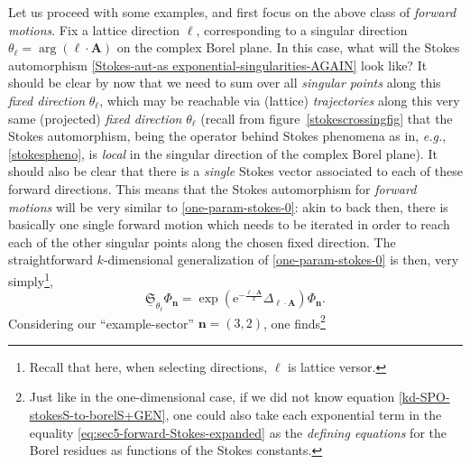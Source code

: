 \documentclass[11pt,a4paper]{article}
\newcommand{\rme}{{\mathrm{e}}}
\begin{document}
Let us proceed with some examples, and first focus on the above class of \textit{forward motions}. Fix a lattice direction $\boldsymbol{\ell}$, corresponding to a singular direction $\theta_{\boldsymbol{\ell}} = \arg \left( \boldsymbol{\ell} \cdot \boldsymbol{A} \right)$ on the complex Borel plane. In this case, what will the Stokes automorphism \eqref{Stokes-aut-as exponential-singularities-AGAIN} look like? It should be clear by now that we need to sum over all \textit{singular points} along this \textit{fixed direction} $\theta_{\boldsymbol{\ell}}$, which may be reachable via (lattice) \textit{trajectories} along this very same (projected) \textit{fixed direction} $\theta_{\boldsymbol{\ell}}$ (recall from figure~\ref{stokescrossingfig} that the Stokes automorphism, being the operator behind Stokes phenomena as in, \textit{e.g.}, \eqref{stokespheno}, is \textit{local} in the singular direction of the complex Borel plane). It should also be clear that there is a \textit{single} Stokes vector associated to each of these forward directions. This means that the Stokes automorphism for \textit{forward motions} will be very similar to \eqref{one-param-stokes-0}: akin to back then, there is basically one single forward motion which needs to be iterated in order to reach each of the other singular points along the chosen fixed direction. The straightforward $k$-dimensional generalization of \eqref{one-param-stokes-0} is then, very simply\footnote{Recall that here, when selecting directions, $\boldsymbol{\ell}$ is lattice versor.},
%
\begin{equation}
\label{eq:sec5-Stokes-forward-direction-theta}
\underline{\mathfrak{S}}_{\theta_{\boldsymbol{\ell}}} \Phi_{\boldsymbol{n}} = \exp \left( \rme^{-\frac{\boldsymbol{\ell}\cdot\boldsymbol{A}}{x}} \Delta_{\boldsymbol{\ell}\cdot\boldsymbol{A}} \right) \Phi_{\boldsymbol{n}}.
\end{equation}
%
\noindent
Considering our ``example-sector'' $\boldsymbol{n} = (3,2)$, one finds\footnote{Just like in the one-dimensional case, if we did not know equation \eqref{kd-SPO-stokesS-to-borelS+GEN}, one could also take each exponential term in the equality \eqref{eq:sec5-forward-Stokes-expanded} as the \textit{defining equations} for the Borel residues as functions of the Stokes constants.}
%
\end{document}
